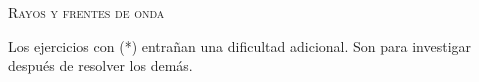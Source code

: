 \documentclass[11pt, spanish, a4paper, twoside]{article}
\begin{document}
\begin{center}
	\textsc{\LARGE Rayos y frentes de onda}
\end{center}

Los ejercicios con (*) entrañan una dificultad adicional. Son para investigar después de resolver los demás.


\begin{enumerate}










\end{enumerate}
\end{document}
